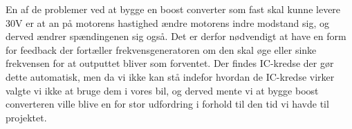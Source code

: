 En af de problemer ved at bygge en boost converter som fast skal kunne levere 30V er at an på motorens hastighed ændre motorens indre modstand sig, og derved ændrer spændingenen sig også. Det er derfor nødvendigt at have en form for feedback der fortæller frekvensgeneratoren om den skal øge eller sinke frekvensen for at outputtet bliver som forventet. Der findes IC-kredse der gør dette automatisk, men da vi ikke kan stå indefor hvordan de IC-kredse virker valgte vi ikke at bruge dem i vores bil, og derved mente vi at bygge boost converteren ville blive en for stor udfordring i forhold til den tid vi havde til projektet.
